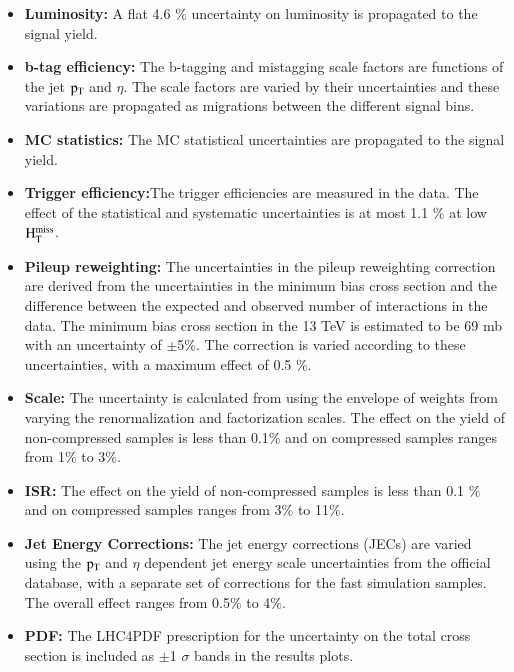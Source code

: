 \begin{itemize}

\item {\bf Luminosity:} A flat 4.6 $\%$ uncertainty on luminosity is propagated to the signal yield. 

\item {\bf b-tag efficiency:} The b-tagging and mistagging scale factors are functions of the jet
 $\rm p_{T}$ and $\eta$. The scale factors are varied by their uncertainties and these variations are propagated as migrations between the different signal bins.

\item {\bf MC statistics:} The MC statistical uncertainties are propagated to the signal yield. 

\item {\bf Trigger efficiency:}The trigger efficiencies are measured in the data.
The effect of the statistical and systematic uncertainties is at most 1.1 $\%$ at low $\rm H_{T}^{miss}$.

\item {\bf Pileup reweighting: }The uncertainties in the pileup reweighting correction are derived from the uncertainties in the minimum bias cross section and the difference between the expected and  observed number of interactions in the data. The minimum bias cross section in the 13 TeV is estimated to be 69 mb with an uncertainty of $\pm$5$ \%$. The correction is varied according to these uncertainties, with a maximum effect of 0.5 $\%$.

\item {\bf Scale:} The uncertainty is calculated from using the envelope of weights from varying the renormalization and factorization scales. The effect on the yield of non-compressed samples is less than 0.1$\%$ and on compressed samples ranges from 1$\%$ to 3$\%$.

\item {\bf ISR: } The effect on the yield of non-compressed samples is less than 0.1 $\%$ and on compressed samples ranges from 3$\%$ to 11$\%$.


\item {\bf Jet Energy Corrections: } The jet energy corrections (JECs) are varied using the $\rm p_{T}$
and $\eta$ dependent jet energy scale uncertainties from the official database, with a separate set of corrections for the fast simulation samples. The overall effect ranges from 0.5$\%$ to 4$\%$. 

\item {\bf PDF: } The LHC4PDF prescription for the uncertainty on the total cross section is included as $\pm$1 $\sigma$ bands in the results plots. 

\end{itemize}




















